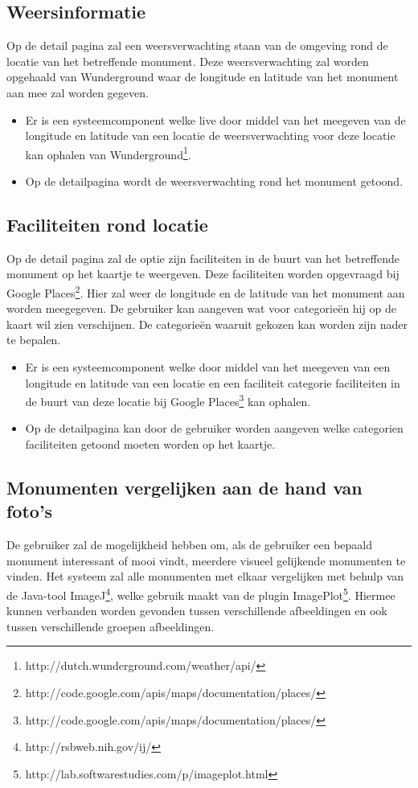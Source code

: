 \documentclass[a4paper,10pt]{article}
\begin{document}
            \subsection{Weersinformatie}
            Op de detail pagina zal een weersverwachting staan van de omgeving rond de locatie van het betreffende monument. Deze weersverwachting zal worden opgehaald van Wunderground waar de longitude en latitude van het monument aan mee zal worden gegeven.
            \begin{itemize}
            \item Er is een systeemcomponent welke live door middel van het meegeven van de longitude en latitude van een locatie de weersverwachting voor deze locatie kan ophalen van Wunderground\footnote{http://dutch.wunderground.com/weather/api/}.
            \item Op de detailpagina wordt de weersverwachting rond het monument getoond.
            \end{itemize}
                
            \subsection{Faciliteiten rond locatie}
            Op de detail pagina zal de optie zijn faciliteiten in de buurt van het betreffende monument op het kaartje te weergeven. Deze faciliteiten worden opgevraagd bij Google Places\footnote{http://code.google.com/apis/maps/documentation/places/}. Hier zal weer de longitude en de latitude van het monument aan worden meegegeven. De gebruiker kan aangeven wat voor categorie\"en hij op de kaart wil zien verschijnen. De categorie\"en waaruit gekozen kan worden zijn nader te bepalen.
            \begin{itemize}
            \item Er is een systeemcomponent welke door middel van het meegeven van een longitude en latitude van een locatie en een faciliteit categorie faciliteiten in de buurt van deze locatie bij Google Places\footnote{http://code.google.com/apis/maps/documentation/places/} kan ophalen.
            \item Op de detailpagina kan door de gebruiker worden aangeven welke categorien faciliteiten getoond moeten worden op het kaartje.
            \end{itemize}
                
            \subsection{Monumenten vergelijken aan de hand van foto's}
            De gebruiker zal de mogelijkheid hebben om, als de gebruiker een bepaald monument interessant of mooi vindt, meerdere visueel gelijkende monumenten te vinden. Het systeem zal alle monumenten met elkaar vergelijken met behulp van de Java-tool ImageJ\footnote{http://rsbweb.nih.gov/ij/}, welke gebruik maakt van de plugin ImagePlot\footnote{http://lab.softwarestudies.com/p/imageplot.html}. Hiermee kunnen verbanden worden gevonden tussen verschillende afbeeldingen en ook tussen verschillende groepen afbeeldingen.
                
\end{document}
